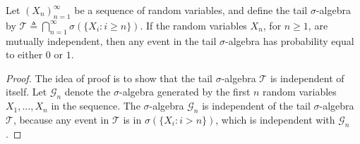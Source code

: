 \begin{theorem}
Let $(X_n)_{n=1}^\infty$ be a sequence of random variables, and define the tail $\sigma$-algebra by $\mathcal{T} \triangleq \bigcap_{n=1}^{\infty} \sigma(\{X_i:i\ge n\})$. If the random variables $X_n$, for $n\ge 1$, are mutually independent, then any event in the tail $\sigma$-algebra has probability equal to either $0$ or $1$.
\end{theorem}

\begin{proof}
The idea of proof is to show that the tail $\sigma$-algebra $\mathcal{T}$ is independent of itself. Let $\mathcal{G}_n$ denote the $\sigma$-algebra generated by the first $n$ random variables $X_1,\dots,X_n$ in the sequence. The $\sigma$-algebra $\mathcal{G}_n$ is independent of the tail $\sigma$-algebra $\mathcal{T}$, because any event in $\mathcal{T}$ is in $\sigma(\{X_i:i>n\})$, which is independent with $\mathcal{G}_n$.
\end{proof}

